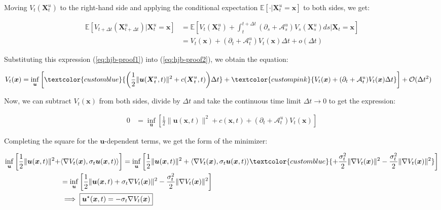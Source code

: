 \documentclass{article}
\newcommand{\bluetext}[1]{\textcolor{customblue}{#1}}
\newcommand{\pinktext}[1]{\textcolor{custompink}{#1}}
\begin{document}
Moving $V_t(\boldsymbol{X}^u_t)$ to the right-hand side and applying the conditional expectation $\mathbb{E}[\cdot|\boldsymbol{X}^u_t=\boldsymbol{x}]$ to both sides, we get: 
\begin{small}
\begin{align}
    \mathbb{E}[V_{t+\Delta t}(\boldsymbol{X}^u_{t+\Delta t})|\boldsymbol{X}^u_t=\boldsymbol{x}]&=\mathbb{E}\left[V_t(\boldsymbol{X}^u_t)+\int_t^{t+\Delta t}(\partial_s+\mathcal{A}^u_s)V_s(\boldsymbol{X}^u_s)ds\bigg|\boldsymbol{X}_t=\boldsymbol{x}\right]\nonumber\\
    &=V_t(\boldsymbol{x})+(\partial_t+\mathcal{A}^u_t)V_t(\boldsymbol{x})\Delta t+o(\Delta t)\label{eq:hjb-proof1}
\end{align}
\end{small}
Substituting this expression (\ref{eq:hjb-proof1}) into (\ref{eq:hjb-proof2}), we obtain the equation:
\begin{small}
\begin{align}
    V_t(\boldsymbol{x})&=\inf_{\boldsymbol{u}}\bigg[\bluetext{\bigg(\frac{1}{2}\|\boldsymbol{u}(\boldsymbol{X}^u_t,t)\|^2+c(\boldsymbol{X}^u_t,t)\bigg)\Delta t }+\pinktext{V_t(\boldsymbol{x})+(\partial_t+\mathcal{A}^u_t)V_t(\boldsymbol{x})\Delta t}\bigg]+\mathcal{O}(\Delta t^2)
\end{align}
\end{small}
Now, we can subtract $V_t(\boldsymbol{x})$ from both sides, divide by $\Delta t$ and take the continuous time limit $\Delta t\to 0$ to get the expression:
\begin{small}
\begin{align}
    0&=\inf_{\boldsymbol{u}}\left[\frac{1}{2}\|\boldsymbol{u}(\boldsymbol{x},t)\|^2+c(\boldsymbol{x},t)+(\partial_t+\mathcal{A}^u_t)V_t(\boldsymbol{x})\right]\label{eq:hjb-proof3}
\end{align}
\end{small}
Completing the square for the $\boldsymbol{u}$-dependent terms, we get the form of the minimizer:
\begin{small}
\begin{align}
    \inf_{\boldsymbol{u}}\bigg[\frac{1}{2}\|\boldsymbol{u}(\boldsymbol{x},t)\|^2+&\langle \nabla V_t(\boldsymbol{x}), \sigma_t\boldsymbol{u}(\boldsymbol{x},t)\rangle\bigg]=\inf_{\boldsymbol{u}}\left[\frac{1}{2}\|\boldsymbol{u}(\boldsymbol{x},t)\|^2+\langle \nabla V_t(\boldsymbol{x}), \sigma_t\boldsymbol{u}(\boldsymbol{x},t)\rangle\bluetext{+\frac{\sigma^2_t}{2}\|\nabla V_t(\boldsymbol{x})\|^2-\frac{\sigma^2_t}{2}\|\nabla V_t(\boldsymbol{x})\|^2}\right]\nonumber\\
    &=\inf_{\boldsymbol{u}}\left[\frac{1}{2}\|\boldsymbol{u}(\boldsymbol{x},t)+\sigma_t\nabla V_t(\boldsymbol{x})\|^2-\frac{\sigma^2_t}{2}\|\nabla V_t(\boldsymbol{x})\|^2\right]\nonumber\\
    &\implies \boxed{\boldsymbol{u}^\star(\boldsymbol{x},t)=-\sigma_t\nabla V_t(\boldsymbol{x})}
\end{align}
\end{small}
\end{document}
